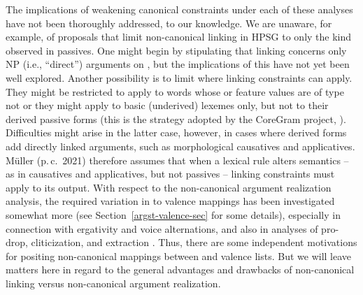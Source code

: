 \documentclass[output=paper
 	        ,biblatex
                ,babelshorthands
                ,newtxmath
                ,draftmode
                ,colorlinks, citecolor=brown
]{langscibook}
\begin{document}
The implications of weakening canonical constraints under each of these analyses have not been thoroughly addressed, to our knowledge.
We are unaware, for example, of proposals that limit non-canonical linking in HPSG to only the kind observed in passives.
One might begin by stipulating that linking concerns only NP (i.e., ``direct'') arguments on \argst,
but the implications of this have not yet been well explored. 
%
Another possibility is to limit where linking constraints can apply. They might be restricted to
apply to words whose  or  feature values are of type  not
 \citep[362]{runara03} or they might apply to basic (underived) lexemes only, but not to
their derived passive forms (this is the strategy adopted by the CoreGram project,
\citealt{MuellerCoreGram}). Difficulties might arise in the latter case, however, in cases where
derived forms add directly linked arguments, such as morphological causatives and applicatives.
Müller (p.\,c.\, 2021) therefore assumes that when a lexical rule alters semantics -- as in
causatives and applicatives, but not passives -- linking constraints must apply to its output.
%
With respect to the non-canonical argument realization analysis, the required variation in \argst to
valence mappings has been investigated somewhat more (see Section~\ref{argst-valence-sec} for some
details), especially in connection with ergativity and voice alternations, and also in analyses of
pro-drop, cliticization, and extraction \citep{MillerandSag1997, Manning+Sag:1999, Boumaetal2001}.
Thus, there are some independent motivations for positing non-canonical mappings between \argst and
valence lists.
But we will leave matters here in regard to the general advantages and drawbacks of non-canonical linking versus non-canonical argument realization.
\end{document}
